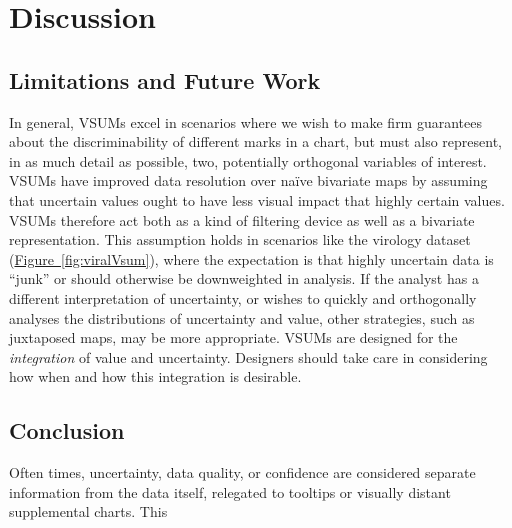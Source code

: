 \documentclass{vgtc}                          %
\newcommand{\figref}[1]{\hyperref[#1]{Figure~\ref*{#1}}}
\begin{document}
\section{Discussion}


\subsection{Limitations and Future Work}
In general, VSUMs excel in scenarios where we wish to make firm guarantees about the discriminability of different marks in a chart, but must also represent, in as much detail as possible, two, potentially orthogonal variables of interest. VSUMs have improved data resolution over na\"ive bivariate maps by assuming that uncertain values ought to have less visual impact that highly certain values. VSUMs therefore act both as a kind of filtering device as well as a bivariate representation. This assumption holds in scenarios like the virology dataset (\figref{fig:viralVsum}), where the expectation is that highly uncertain data is ``junk'' or should otherwise be downweighted in analysis. If the analyst has a different interpretation of uncertainty, or wishes to quickly and orthogonally analyses the distributions of uncertainty and value, other strategies, such as juxtaposed maps, may be more appropriate. VSUMs are designed for the \emph{integration} of value and uncertainty. Designers should take care in considering how when and how this integration is desirable.


\subsection{Conclusion}

Often times, uncertainty, data quality, or confidence are considered separate information from the data itself, relegated to tooltips or visually distant supplemental charts. This 


%

%
%
%


\end{document}
